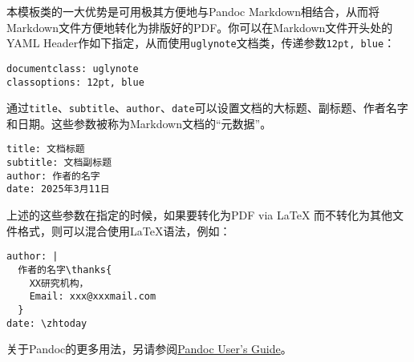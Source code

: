 本模板类的一大优势是可用极其方便地与Pandoc Markdown相结合，从而将Markdown文件方便地转化为排版好的PDF。你可以在Markdown文件开头处的YAML Header作如下指定，从而使用\texttt{uglynote}文档类，传递参数\texttt{12pt, blue}：

\begin{verbatim}
documentclass: uglynote
classoptions: 12pt, blue
\end{verbatim}

通过\texttt{title}、\texttt{subtitle}、\texttt{author}、\texttt{date}可以设置文档的大标题、副标题、作者名字和日期。这些参数被称为Markdown文档的“元数据”。

\begin{verbatim}
title: 文档标题
subtitle: 文档副标题
author: 作者的名字
date: 2025年3月11日
\end{verbatim}

\begin{note}
上述的这些参数在指定的时候，如果要转化为PDF via \LaTeX{} 而不转化为其他文件格式，则可以混合使用\LaTeX{}语法，例如：

\begin{verbatim}
author: |
  作者的名字\thanks{
    XX研究机构，
    Email: xxx@xxxmail.com
  }
date: \zhtoday
\end{verbatim}
\end{note}

关于Pandoc的更多用法，另请参阅\href{https://pandoc.org/MANUAL.html}{Pandoc User's Guide}。
